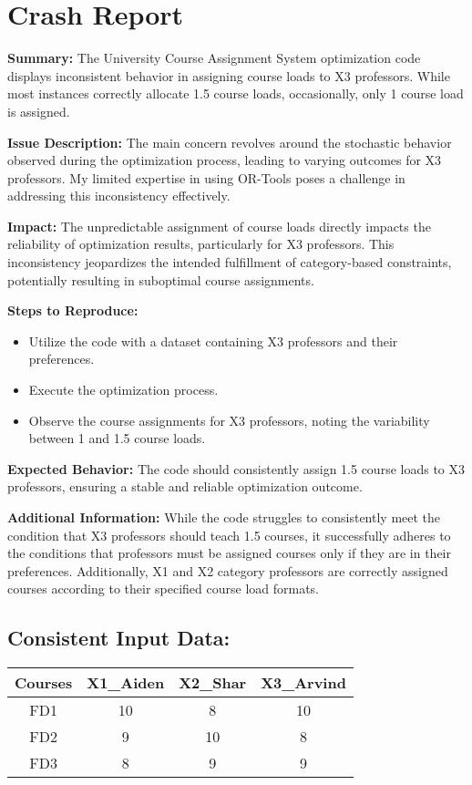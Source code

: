 \documentclass{article}
\begin{document}
	
	\section*{Crash Report}
	\textbf{Summary:} The University Course Assignment System optimization code displays inconsistent behavior in assigning course loads to X3 professors. While most instances correctly allocate 1.5 course loads, occasionally, only 1 course load is assigned.
	
	\textbf{Issue Description:} The main concern revolves around the stochastic behavior observed during the optimization process, leading to varying outcomes for X3 professors. My limited expertise in using OR-Tools poses a challenge in addressing this inconsistency effectively.
	
	\textbf{Impact:} The unpredictable assignment of course loads directly impacts the reliability of optimization results, particularly for X3 professors. This inconsistency jeopardizes the intended fulfillment of category-based constraints, potentially resulting in suboptimal course assignments.
	
	\textbf{Steps to Reproduce:}
	\begin{itemize}
		\item Utilize the code with a dataset containing X3 professors and their preferences.
		\item Execute the optimization process.
		\item Observe the course assignments for X3 professors, noting the variability between 1 and 1.5 course loads.
	\end{itemize}
	
	\textbf{Expected Behavior:} The code should consistently assign 1.5 course loads to X3 professors, ensuring a stable and reliable optimization outcome.
	
	\textbf{Additional Information:} While the code struggles to consistently meet the condition that X3 professors should teach 1.5 courses, it successfully adheres to the conditions that professors must be assigned courses only if they are in their preferences. Additionally, X1 and X2 category professors are correctly assigned courses according to their specified course load formats.
	
	\subsection*{Consistent Input Data:}
\begin{tabular}{|c|c|c|c|}
	\hline
	Courses & X1\_Aiden & X2\_Shar & X3\_Arvind \\
	\hline
	FD1 & 10 & 8 & 10 \\
	FD2 & 9 & 10 & 8 \\
	FD3 & 8 & 9 & 9 \\
	\hline
\end{tabular}
	
\end{document}
